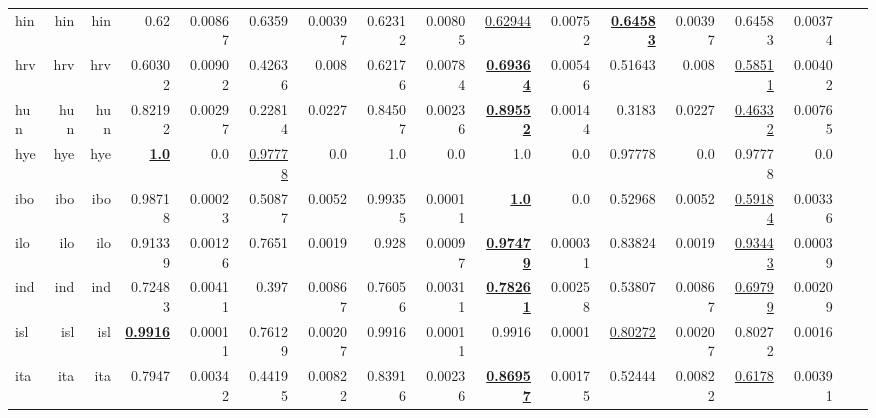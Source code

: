 \documentclass[11pt]{article}
\begin{document}
\begin{table*}[h]
{\begin{tabular}{lrrrrrrrrrrrrrrrr}
hin         & hin         & hin         & 0.62         & 0.00867         & 0.6359         & 0.00397         & 0.62312         & 0.00805         & \underline{0.62944}         & 0.00752         & \textbf{\underline{0.64583}}         & 0.00397         & 0.64583         & 0.00374         \\
hrv         & hrv         & hrv         & 0.60302         & 0.00902         & 0.42636         & 0.008         & 0.62176         & 0.00784         & \textbf{\underline{0.69364}}         & 0.00546         & 0.51643         & 0.008         & \underline{0.58511}         & 0.00402         \\
hun         & hun         & hun         & 0.82192         & 0.00297         & 0.22814         & 0.0227         & 0.84507         & 0.00236         & \textbf{\underline{0.89552}}         & 0.00144         & 0.3183         & 0.0227         & \underline{0.46332}         & 0.00765         \\
hye         & hye         & hye         & \textbf{\underline{1.0}}         & 0.0         & \underline{0.97778}         & 0.0         & 1.0         & 0.0         & 1.0         & 0.0         & 0.97778         & 0.0         & 0.97778         & 0.0         \\
ibo         & ibo         & ibo         & 0.98718         & 0.00023         & 0.50877         & 0.0052         & 0.99355         & 0.00011         & \textbf{\underline{1.0}}         & 0.0         & 0.52968         & 0.0052         & \underline{0.59184}         & 0.00336         \\
ilo         & ilo         & ilo         & 0.91339         & 0.00126         & 0.7651         & 0.0019         & 0.928         & 0.00097         & \textbf{\underline{0.97479}}         & 0.00031         & 0.83824         & 0.0019         & \underline{0.93443}         & 0.00039         \\
ind         & ind         & ind         & 0.72483         & 0.00411         & 0.397         & 0.00867         & 0.76056         & 0.00311         & \textbf{\underline{0.78261}}         & 0.00258         & 0.53807         & 0.00867         & \underline{0.69799}         & 0.00209         \\
isl         & isl         & isl         & \textbf{\underline{0.9916}}         & 0.00011         & 0.76129         & 0.00207         & 0.9916         & 0.00011         & 0.9916         & 0.0001         & \underline{0.80272}         & 0.00207         & 0.80272         & 0.0016         \\
ita         & ita         & ita         & 0.7947         & 0.00342         & 0.44195         & 0.00822         & 0.83916         & 0.00236         & \textbf{\underline{0.86957}}         & 0.00175         & 0.52444         & 0.00822         & \underline{0.6178}         & 0.00391         \\

\end{tabular}}
\end{table*}
\end{document}
